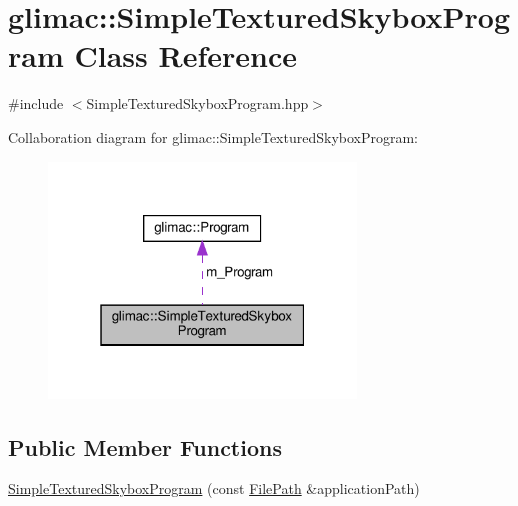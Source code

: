 \hypertarget{classglimac_1_1_simple_textured_skybox_program}{}\section{glimac\+:\+:Simple\+Textured\+Skybox\+Program Class Reference}
\label{classglimac_1_1_simple_textured_skybox_program}


{\ttfamily \#include $<$Simple\+Textured\+Skybox\+Program.\+hpp$>$}



Collaboration diagram for glimac\+:\+:Simple\+Textured\+Skybox\+Program\+:\nopagebreak
\begin{figure}[H]
\begin{center}
\leavevmode
\includegraphics[width=232pt]{classglimac_1_1_simple_textured_skybox_program__coll__graph}
\end{center}
\end{figure}
\subsection*{Public Member Functions}
\begin{DoxyCompactItemize}
\item 
\hyperlink{classglimac_1_1_simple_textured_skybox_program_a234bd930789845e1e97a389d3a577d2a}{Simple\+Textured\+Skybox\+Program} (const \hyperlink{classglimac_1_1_file_path}{File\+Path} \&application\+Path)
\end{DoxyCompactItemize}
